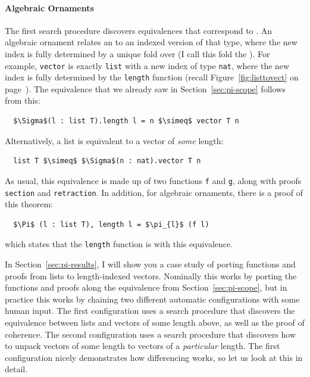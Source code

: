 
\paragraph{Algebraic Ornaments}
The first search procedure discovers equivalences that correspond to .
An algebraic ornament relates an  to an indexed version of that type,
where the new index is fully determined by a unique fold over \Aa (I call this fold the ). 
For example, \lstinline{vector} is exactly \lstinline{list} with a new index of type \lstinline{nat},
where the new index is fully determined by the \lstinline{length} function (recall Figure~\ref{fig:listtovect} on page~\pageref{fig:listtovect}).
The equivalence that we already saw in Section~\ref{sec:pi-scope} follows from this:

\begin{lstlisting}
  $\Sigma$(l : list T).length l = n $\simeq$ vector T n
\end{lstlisting}
Alternatively, a list is equivalent to a vector of \textit{some} length:

\begin{lstlisting}
  list T $\simeq$ $\Sigma$(n : nat).vector T n
\end{lstlisting}
As usual, this equivalence is made up of two functions \lstinline{f} and \lstinline{g}, along with proofs \lstinline{section} and \lstinline{retraction}.
In addition, for algebraic ornaments, there is a proof of this theorem:

\begin{lstlisting}
  $\Pi$ (l : list T), length l = $\pi_{l}$ (f l)
\end{lstlisting}
which states that the \lstinline{length} function is  with this equivalence.

In Section~\ref{sec:pi-results}, I will show you a case study of porting functions and proofs from lists to length-indexed vectors.
Nominally this works by porting the functions and proofs along the equivalence from Section~\ref{sec:pi-scope},
but in practice this works by chaining two different automatic configurations with some human input.
The first configuration uses a search procedure that discovers the equivalence between lists and vectors of some length above,
as well as the proof of coherence.
The second configuration uses a search procedure that discovers how to unpack vectors of some length to vectors of a \textit{particular} length.
The first configuration nicely demonstrates how differencing works, so let us look at this in detail.

